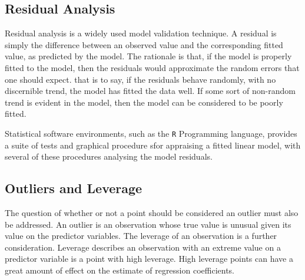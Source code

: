 \documentclass[12pt, a4paper]{report}
\theoremstyle{plain}
\theoremstyle{definition}
\theoremstyle{remark}
\begin{document}
\subsection{Residual Analysis}

Residual analysis is a widely used model validation technique. A residual is simply the difference between an observed value and the corresponding fitted value, as predicted by the model. The rationale is that, if the model is properly fitted to the model, then the residuals would approximate the random errors that one should expect.
that is to say, if the residuals behave randomly, with no discernible trend, the model has fitted the data well. If some sort of non-random trend is evident in the model, then the model can be considered to be poorly fitted.


Statistical software environments, such as the \texttt{R} Programming language, provides a suite of tests and graphical procedure sfor appraising a fitted linear model, with several 
of these procedures analysing the model residuals.

\subsection{Outliers and Leverage}



The question of whether or not a point should be considered an outlier must also be addressed. An outlier is an observation whose true value is unusual given its value on the predictor variables. The leverage of an observation is a further consideration. Leverage describes an observation with an extreme value on a predictor variable is a point with high leverage. High leverage points can have a great amount of effect on the estimate of regression coefficients.
\end{document}
